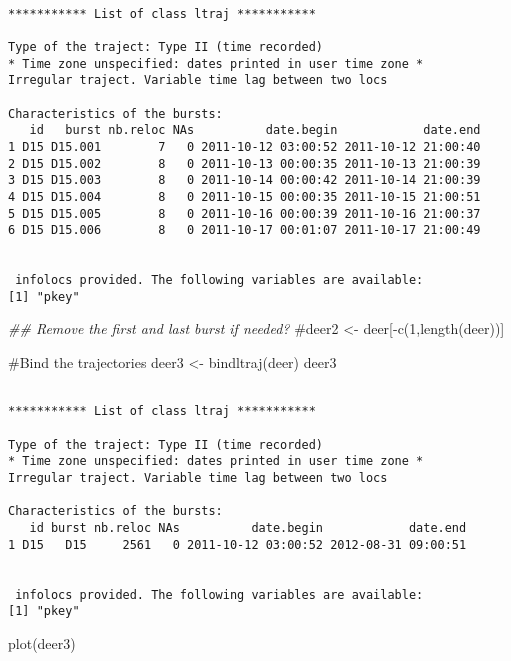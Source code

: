 \documentclass[
  letterpaper,
]{book}
\newenvironment{Shaded}{\begin{snugshade}}{\end{snugshade}}
\newcommand{\CommentTok}[1]{\textcolor[rgb]{0.37,0.37,0.37}{#1}}
\newcommand{\DocumentationTok}[1]{\textcolor[rgb]{0.37,0.37,0.37}{\textit{#1}}}
\newcommand{\FunctionTok}[1]{\textcolor[rgb]{0.28,0.35,0.67}{#1}}
\newcommand{\NormalTok}[1]{\textcolor[rgb]{0.00,0.23,0.31}{#1}}
\newcommand{\OtherTok}[1]{\textcolor[rgb]{0.00,0.23,0.31}{#1}}
\begin{document}
\begin{verbatim}

*********** List of class ltraj ***********

Type of the traject: Type II (time recorded)
* Time zone unspecified: dates printed in user time zone *
Irregular traject. Variable time lag between two locs

Characteristics of the bursts:
   id   burst nb.reloc NAs          date.begin            date.end
1 D15 D15.001        7   0 2011-10-12 03:00:52 2011-10-12 21:00:40
2 D15 D15.002        8   0 2011-10-13 00:00:35 2011-10-13 21:00:39
3 D15 D15.003        8   0 2011-10-14 00:00:42 2011-10-14 21:00:39
4 D15 D15.004        8   0 2011-10-15 00:00:35 2011-10-15 21:00:51
5 D15 D15.005        8   0 2011-10-16 00:00:39 2011-10-16 21:00:37
6 D15 D15.006        8   0 2011-10-17 00:01:07 2011-10-17 21:00:49


 infolocs provided. The following variables are available:
[1] "pkey"
\end{verbatim}

\begin{Shaded}
\begin{Highlighting}[]
\DocumentationTok{\#\# Remove the first and last burst if needed?}
\CommentTok{\#deer2 \textless{}{-} deer[{-}c(1,length(deer))]}

\CommentTok{\#Bind the trajectories}
\NormalTok{deer3 }\OtherTok{\textless{}{-}} \FunctionTok{bindltraj}\NormalTok{(deer)}
\NormalTok{deer3}
\end{Highlighting}
\end{Shaded}

\begin{verbatim}

*********** List of class ltraj ***********

Type of the traject: Type II (time recorded)
* Time zone unspecified: dates printed in user time zone *
Irregular traject. Variable time lag between two locs

Characteristics of the bursts:
   id burst nb.reloc NAs          date.begin            date.end
1 D15   D15     2561   0 2011-10-12 03:00:52 2012-08-31 09:00:51


 infolocs provided. The following variables are available:
[1] "pkey"
\end{verbatim}

\begin{Shaded}
\begin{Highlighting}[]
\FunctionTok{plot}\NormalTok{(deer3)}
\end{Highlighting}
\end{Shaded}
\end{document}
